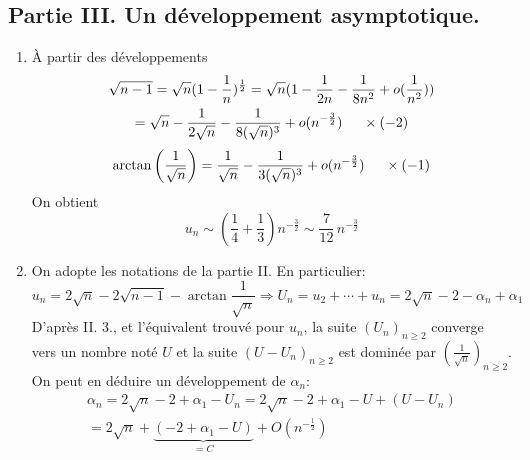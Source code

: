 \subsection*{Partie III. Un développement asymptotique.}
\begin{enumerate}
  \item {\`A} partir des d{\'e}veloppements
\begin{multline*}
\sqrt{n-1} = \sqrt{n}(1-\frac{1}{n})^{\frac{1}{2}}
 = \sqrt{n}(1-\frac{1}{2n}-\frac{1}{8n^2}+o(\frac{1}{n^2}))\\
 = \sqrt{n}-\frac{1}{2 \sqrt{n}}-\frac{1}{8(\sqrt{n})^3} + o(n^{-\frac{3}{2}})\hspace{0.5cm}\times(-2)
\end{multline*}
\begin{displaymath}
  \arctan\left( \frac{1}{\sqrt{n}} \right)
 = \frac{1}{\sqrt{n}}-\frac{1}{3(\sqrt{n})^{3}}+o(n^{-\frac{3}{2}}) \hspace{0.5cm}\times(-1)  
\end{displaymath}
On obtient
\begin{displaymath}
u_n\sim(\frac{1}{4}+\frac{1}{3})n^{-\frac{3}{2}}\sim \frac{7}{12}\,n^{-\frac{3}{2}}  
\end{displaymath}
  \item On adopte les notations de la partie II. En particulier:
\begin{displaymath}
u_n=2\sqrt n-2\sqrt {n-1}-\arctan \frac{1} {\sqrt n}
\Rightarrow  U_n = u_2+\cdots+u_n = 2\sqrt{n} - 2 - \alpha_n + \alpha_1
\end{displaymath}
D'apr{\`e}s II. 3., et l'équivalent trouvé pour $u_n$, la suite $(U_n)_{n\geq 2}$ converge vers un nombre not{\'e} $U$ et la suite $(U-U_n)_{n\geq 2}$ est domin{\'e}e par $(\frac{1}{\sqrt{n}})_{n\geq 2}$.\newline
On peut en déduire un développement de $\alpha_n$:  
\begin{multline*}
\alpha_n  = 2\sqrt{n} - 2 + \alpha_1 - U_n=2\sqrt{n}-2+\alpha_1-U+(U-U_n)\\
   = 2\sqrt{n} + \underset{=C}{\underbrace{(-2+\alpha_1-U)}} + O(n^{-\frac{1}{2}})
\end{multline*}
\end{enumerate}

